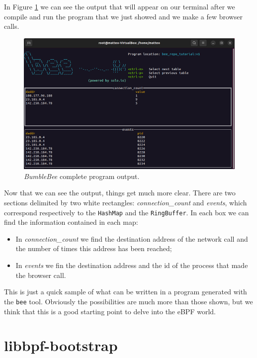 In Figure \ref{fig:bee_compelte_program_output} we can see the output that will appear on our terminal after we compile and run the program that we just showed and we make a few browser calls.

\begin{figure}[h]
	\centering
	\includegraphics[width=0.7\linewidth]{images/LinuxDevelopment/bee_repo_tut_display.png}
	\caption{\textit{BumbleBee} complete program output.}
	\label{fig:bee_compelte_program_output}
\end{figure}

Now that we can see the output, things get much more clear.
There are two sections delimited by two white rectangles: \textit{connection\_count} and \textit{events}, which correspond respectively to the \verb|HashMap| and the \verb|RingBuffer|.
In each box we can find the information contained in each map:

\begin{itemize}
	\item In \textit{connection\_count} we find the destination address of the network
		call and the number of times this address has been reached;
	\item In \textit{events} we fin the destination address and the id of the process 
		that made the browser call.
\end{itemize}

This is just a quick sample of what can be written in a program generated with the \verb|bee| tool.
Obviously the possibilities are much more than those shown, but we think that this is a good starting point to delve into the eBPF world.

\section{libbpf-bootstrap}



